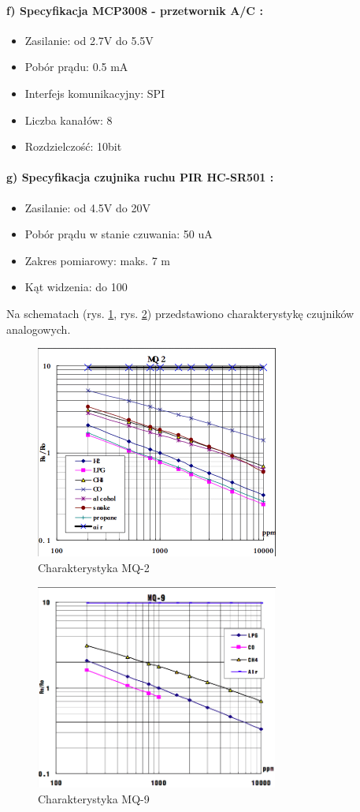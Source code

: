 \paragraph{f) Specyfikacja MCP3008 - przetwornik A/C \protect\cite{specyfikacjaAC}:}
\begin{itemize} 
\item Zasilanie: od 2.7V do 5.5V
\item Pobór prądu: 0.5 mA
\item Interfejs komunikacyjny: SPI
\item Liczba kanałów: 8
\item Rozdzielczość: 10bit
\end{itemize}
\paragraph{g) Specyfikacja czujnika ruchu PIR HC-SR501 \protect\cite{pir}:}
\begin{itemize} 
\item Zasilanie: od 4.5V do 20V
\item Pobór prądu w stanie czuwania: 50 uA
\item Zakres pomiarowy: maks. 7 m
\item Kąt widzenia: do 100\textdegree{}
\end{itemize}
Na schematach (rys. \ref{mq2}, rys. \ref{mq9}) przedstawiono charakterystykę czujników analogowych.
\begin{figure}[ht]
	\centering
	\includegraphics[width=8cm]{MQ2}
	\caption{Charakterystyka MQ-2 \protect\cite{mq2}}
	\label{mq2}
\end{figure}
\begin{figure}[ht]
	\centering
	\includegraphics[width=8cm]{MQ9}
	\caption{Charakterystyka MQ-9 \protect\cite{mq9}}
	\label{mq9}
\end{figure}
